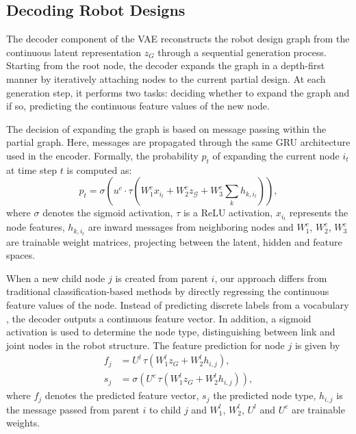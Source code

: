 \documentclass{article}
\theoremstyle{plain}
\theoremstyle{definition}
\theoremstyle{remark}
\begin{document}
\subsection{Decoding Robot Designs}

The decoder component of the VAE reconstructs the robot design graph from the continuous latent 
representation $z_G$ through a sequential generation process. Starting from the root node, the 
decoder expands the graph in a depth-first manner by iteratively attaching nodes to the current 
partial design. At each generation step, it performs two tasks: deciding whether to expand the graph and if so, predicting the continuous feature values of the new node.

The decision of expanding the graph is based on message passing within the partial graph. Here, messages are propagated through the same 
GRU architecture used in the encoder. Formally, the probability $p_t$ of expanding the current 
node $i_t$ at time step $t$ is computed as:
\begin{equation}
p_t = \sigma (u^c \cdot \tau (W_1^c x_{i_t} + W_2^c z_{\mathcal{G}} + W_3^c \sum_{k} h_{k,i_t})),
\end{equation}
where $\sigma$ denotes the sigmoid activation, $\tau$ is a ReLU activation, $x_{i_t}$ represents 
the node features, $h_{k,i_t}$ are inward messages from neighboring nodes and $W_1^c$, $W_2^c$, $W_3^c$ are trainable weight matrices, projecting between the latent, hidden and feature spaces.

When a new child node $j$ is created from parent $i$, our approach differs from traditional 
classification-based methods \cite{hu2023glso} by directly regressing the continuous feature values of the node. 
Instead of predicting discrete labels from a vocabulary \cite{zhao2020robogrammar}, the decoder outputs a continuous feature 
vector. In addition, a sigmoid activation is used to determine the node type, distinguishing 
between link and joint nodes in the robot structure. The feature prediction for node $j$ is given by
\begin{align}
f_j &= U^{l} \, \tau \left(W_1^l z_G + W_2^l h_{i,j}\right), \\
s_j &= \sigma \left(U^{c} \, \tau \left(W_1^l z_G + W_2^l h_{i,j}\right)\right),
\end{align}
where $f_j$ denotes the predicted 
feature vector, $s_j$ the predicted node type, $h_{i,j}$ is the message passed from parent $i$ to child $j$ and $W_1^l$, $W_2^l$, $U^l$ and $U^c$ are trainable weights.
\end{document}
